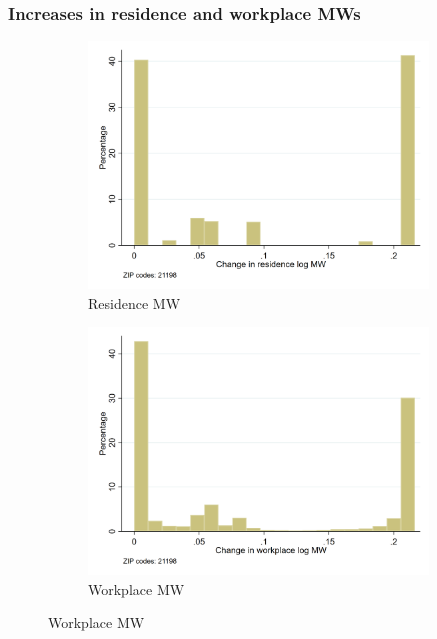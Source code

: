 \documentclass[aspectratio=169, t]{beamer}
\begin{document}
\begin{frame}
	\frametitle{Increases in residence and workplace MWs}
	\begin{figure}
		\begin{subfigure}{0.51\textwidth}
			\includegraphics[width = 0.99\textwidth]{counterfactuals/output/d_ln_mw.png}
			\caption*{Residence MW}
		\end{subfigure}%
		\begin{subfigure}{0.51\textwidth}
			\includegraphics[width = 0.99\textwidth]{counterfactuals/output/d_exp_ln_mw_17.png}
			\caption*{Workplace MW}
		\end{subfigure}
	\end{figure}
\end{frame}
\end{document}
